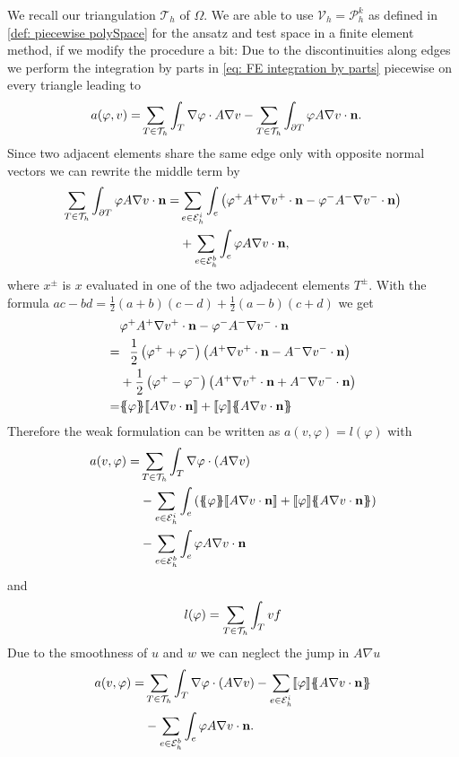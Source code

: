 We recall our triangulation $\mathcal{T}_h$ of $\Omega$. We are able to use $\mathcal V_h = \mathcal P_h^k$ as defined in \ref*{def: piecewise polySpace} for the ansatz and test space in a finite element method, if we modify the procedure a bit: Due to the discontinuities along edges we perform the integration by parts in \eqref{eq: FE integration by parts} piecewise on every triangle leading to
\begin{align}
	a(\varphi, v) = & \sum_{T \in \mathcal{T}_h} \int_T \nabla \varphi \cdot A \nabla v - \sum_{T \in \mathcal{T}_h} \int_{\partial T} \varphi A \nabla v \cdot \mathbf n.
\end{align}
Since two adjacent elements share the same edge only with opposite normal vectors we can rewrite the middle term by
\begin{align*}
\sum\limits_{T \in \mathcal{T}_h}\int_{\partial T} \varphi A \nabla v \cdot \mathbf n 
= &\sum\limits_{e \in \mathcal{E}_h^i}\int_{e} \left( \varphi^+ A^+ \nabla v^+ \cdot \mathbf n - \varphi^- A^- \nabla v^- \cdot \mathbf n \right) \\
& + \sum\limits_{e \in \mathcal{E}_h^b}\int_{e} \varphi A \nabla v \cdot \mathbf n,
\end{align*}
where $x^\pm $ is $x$ evaluated in one of the two adjadecent elements $T^\pm$. With the formula $ac-bd = \frac 1 2 (a+b)(c-d) + \frac 1 2 (a-b)(c+d)$ we get
\begin{align*}
	&\varphi^+ A^+ \nabla v^+ \cdot \mathbf n - \varphi^- A^- \nabla v^- \cdot \mathbf n \\
	= & \phantom{+} \frac 1 2 \left(\varphi^+ + \varphi^- \right) \left(A^+ \nabla v^+ \cdot \mathbf n - A^- \nabla v^- \cdot \mathbf n \right) \\
  &+  \frac 1 2 \left(\varphi^+ - \varphi^- \right) \left(A^+ \nabla v^+ \cdot \mathbf n + A^- \nabla v^- \cdot \mathbf n \right) \\
  = &  \average \varphi \jump { A \nabla v \cdot \mathbf n }+ \jump \varphi \average{ A \nabla v \cdot  \mathbf n }
\end{align*}
Therefore the weak formulation can be written as $a(v,\varphi) = l(\varphi)$ with 
\begin{align*}
  a(v, \varphi) = & \sum\limits_{T \in \triang} \int_T \nabla \varphi \cdot \left(A \nabla v\right) \\
	& - \sum\limits_{e \in \edgesi}\int_{e} \left( \average \varphi \jump {A \nabla v \cdot \mathbf n } + \jump \varphi \average{ A \nabla v \cdot \mathbf n } \right)\\
& - \sum\limits_{e \in \edgesb}\int_{e} \varphi A \nabla v \cdot \mathbf n
\end{align*}
and
\[
l(\varphi) = \sum_{T \in \mathcal{T}_h} \int_T v f
\]
Due to the smoothness of $u$ and $w$ we can neglect the jump in $A \nabla u$
\begin{align*}
 a(v, \varphi) = & \sum\limits_{T \in \triang} \int_T \nabla \varphi \cdot \left(A \nabla v\right) %
	- \sum\limits_{e \in \edgesi}
	\jump \varphi \average{ A \nabla v \cdot \mathbf n } %
	\\
& - \sum\limits_{e \in \edgesb}\int_{e} \varphi A \nabla v \cdot \mathbf n.
\end{align*}

